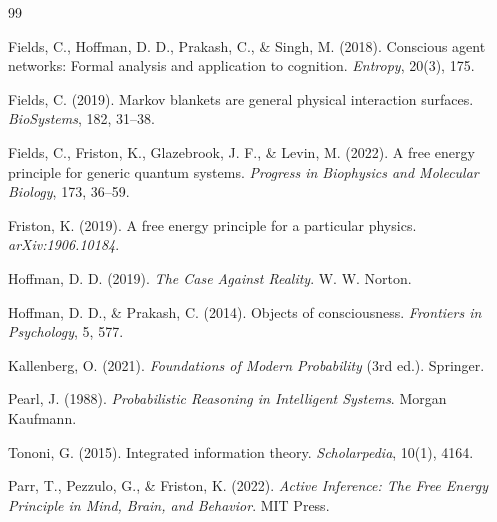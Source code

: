 \documentclass[11pt,a4paper]{article}
\begin{document}
\begin{thebibliography}{99}

Fields, C., Hoffman, D. D., Prakash, C., \& Singh, M. (2018). Conscious agent networks: Formal analysis and application to cognition. \emph{Entropy}, 20(3), 175.

Fields, C. (2019). Markov blankets are general physical interaction surfaces. \emph{BioSystems}, 182, 31--38.

Fields, C., Friston, K., Glazebrook, J. F., \& Levin, M. (2022). A free energy principle for generic quantum systems. \emph{Progress in Biophysics and Molecular Biology}, 173, 36--59.

Friston, K. (2019). A free energy principle for a particular physics. \emph{arXiv:1906.10184}.

Hoffman, D. D. (2019). \emph{The Case Against Reality}. W. W. Norton.

Hoffman, D. D., \& Prakash, C. (2014). Objects of consciousness. \emph{Frontiers in Psychology}, 5, 577.

Kallenberg, O. (2021). \emph{Foundations of Modern Probability} (3rd ed.). Springer.

Pearl, J. (1988). \emph{Probabilistic Reasoning in Intelligent Systems}. Morgan Kaufmann.

Tononi, G. (2015). Integrated information theory. \emph{Scholarpedia}, 10(1), 4164.

Parr, T., Pezzulo, G., \& Friston, K. (2022). \emph{Active Inference: The Free Energy Principle in Mind, Brain, and Behavior}. MIT Press.

\end{thebibliography}
\end{document}
